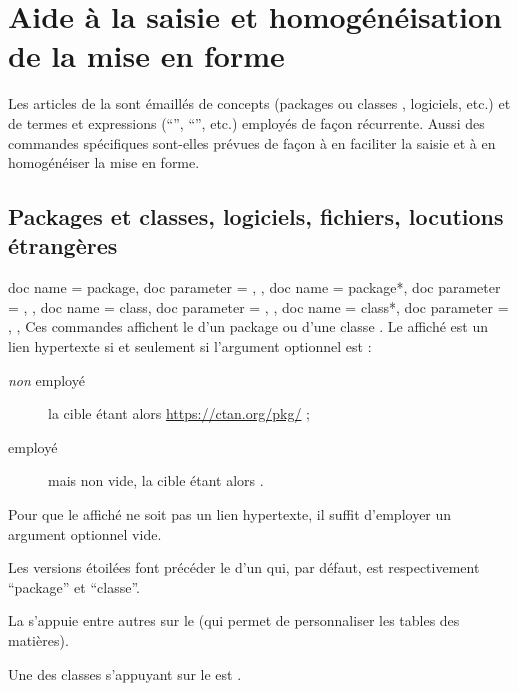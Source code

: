 \documentclass{letgut}
\begin{document}
\section{Aide à la saisie et homogénéisation de la mise en forme}
\label{sec:aide-la-saisie}

Les articles de la  sont émaillés de concepts (packages ou classes
, logiciels, etc.) et de termes et expressions
(\enquote{\gut{}}, \enquote{}, etc.) employés de façon
récurrente. Aussi des commandes spécifiques sont-elles prévues de façon à en
faciliter la saisie et à en homogénéiser la mise en forme.

\subsection{Packages et classes, logiciels, fichiers, locutions étrangères}
\label{sec:classes-packages-et}

\begin{docCommands}
  {
    {
      doc name = package,
      doc parameter = ,
    },
    {
      doc name = package*,
      doc parameter = ,
    },
    {
      doc name = class,
      doc parameter = ,
    },
    {
      doc name = class*,
      doc parameter = ,
    },
  }
  Ces commandes affichent le  d'un package ou d'une classe
  . Le  affiché est un lien hypertexte si et seulement
  si l'argument optionnel est :
  \begin{description}
  \item[\emph{non} employé] la cible étant alors
    \url{https://ctan.org/pkg/} ;
  \item[ employé] mais non vide, la cible étant alors
    .
  \end{description}
  Pour que le  affiché ne soit pas un lien hypertexte, il suffit
  d'employer un argument optionnel vide.

  Les versions étoilées font précéder le  d'un  qui, par
  défaut, est respectivement \enquote{package} et \enquote{classe}.
\end{docCommands}

\begin{ltx-code-result}[title addon=packages et classes,listing options app={deletekeywords={[4]{tables}}}]
La  s'appuie entre autres sur le 
(qui permet de personnaliser les tables des matières).

Une des classes s'appuyant sur le  est
.
\end{ltx-code-result}
\end{document}
